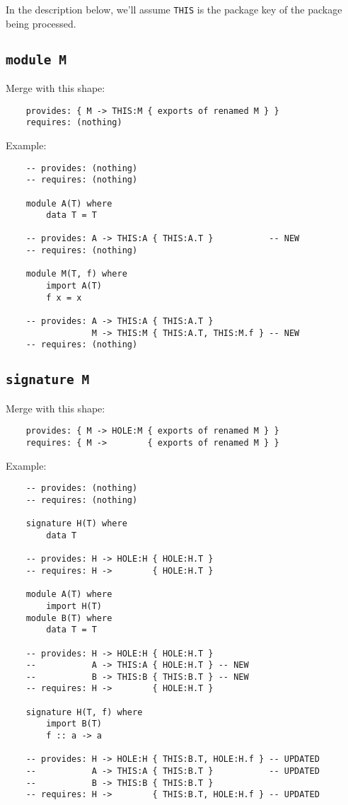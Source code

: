 \documentclass{article}
\begin{document}
In the description below, we'll assume \verb|THIS| is the package key
of the package being processed.

\newpage

\subsection{\texttt{module M}}

Merge with this shape:

\begin{verbatim}
    provides: { M -> THIS:M { exports of renamed M } }
    requires: (nothing)
\end{verbatim}

\noindent Example:

\begin{verbatim}
    -- provides: (nothing)
    -- requires: (nothing)

    module A(T) where
        data T = T

    -- provides: A -> THIS:A { THIS:A.T }           -- NEW
    -- requires: (nothing)

    module M(T, f) where
        import A(T)
        f x = x

    -- provides: A -> THIS:A { THIS:A.T }
                 M -> THIS:M { THIS:A.T, THIS:M.f } -- NEW
    -- requires: (nothing)
\end{verbatim}

\newpage
\subsection{\texttt{signature M}}

Merge with this shape:

\begin{verbatim}
    provides: { M -> HOLE:M { exports of renamed M } }
    requires: { M ->        { exports of renamed M } }
\end{verbatim}

\noindent Example:

\begin{verbatim}
    -- provides: (nothing)
    -- requires: (nothing)

    signature H(T) where
        data T

    -- provides: H -> HOLE:H { HOLE:H.T }
    -- requires: H ->        { HOLE:H.T }

    module A(T) where
        import H(T)
    module B(T) where
        data T = T

    -- provides: H -> HOLE:H { HOLE:H.T }
    --           A -> THIS:A { HOLE:H.T } -- NEW
    --           B -> THIS:B { THIS:B.T } -- NEW
    -- requires: H ->        { HOLE:H.T }

    signature H(T, f) where
        import B(T)
        f :: a -> a

    -- provides: H -> HOLE:H { THIS:B.T, HOLE:H.f } -- UPDATED
    --           A -> THIS:A { THIS:B.T }           -- UPDATED
    --           B -> THIS:B { THIS:B.T }
    -- requires: H ->        { THIS:B.T, HOLE:H.f } -- UPDATED
\end{verbatim}
\end{document}
